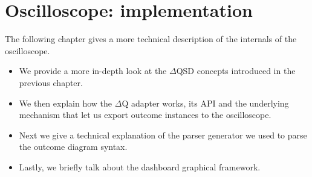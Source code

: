 \chapter{Oscilloscope: implementation}
    The following chapter gives a more technical description of the internals of the oscilloscope.
    \begin{itemize} 
        \item We provide a more in-depth look at the $\Delta$QSD concepts introduced in the previous chapter.
        \item We then explain how the $\Delta$Q adapter works, its API and the underlying mechanism that let us export outcome instances to the oscilloscope.
        \item Next we give a technical explanation of the parser generator we used to parse the outcome diagram syntax.
        \item Lastly, we briefly talk about the dashboard graphical framework.
    \end{itemize}

    
    
    
    

